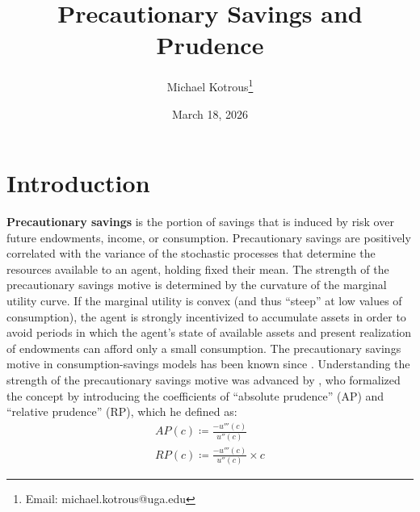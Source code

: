 \documentclass[11pt]{article}
\title{Precautionary Savings and Prudence}
\author[1]{Michael Kotrous\thanks{Email: michael.kotrous@uga.edu}}
\affil[1]{John Munro Godfrey, Sr. Department of Economics\\University of Georgia}
\date{March 18, 2026}
\begin{document}
\symbolfootnotes
\maketitle
\setcounter{page}{1}
\setcounter{footnote}{0}
\arabicfootnotes

\section{Introduction \label{sec:introduction}}

\textbf{Precautionary savings} is the portion of savings that is induced by risk over future endowments, income, or consumption. Precautionary savings are positively correlated with the variance of the stochastic processes that determine the resources available to an agent, holding fixed their mean. The strength of the precautionary savings motive is determined by the curvature of the marginal utility curve. If the marginal utility is convex (and thus ``steep'' at low values of consumption), the agent is strongly incentivized to accumulate assets in order to avoid periods in which the agent's state of available assets and present realization of endowments can afford only a small consumption. The precautionary savings motive in consumption-savings models has been known since \textcite{Leland1968}. Understanding the strength of the precautionary savings motive was advanced by \textcite{Kimball1990}, who formalized the concept by introducing the coefficients of ``absolute prudence'' (AP) and ``relative prudence'' (RP), which he defined as:
\begin{align*}
    AP(c) \coloneqq \frac{-u'''(c)}{u''(c)} \\
    RP(c) \coloneqq \frac{-u'''(c)}{u''(c)} \times c
\end{align*}
\end{document}
